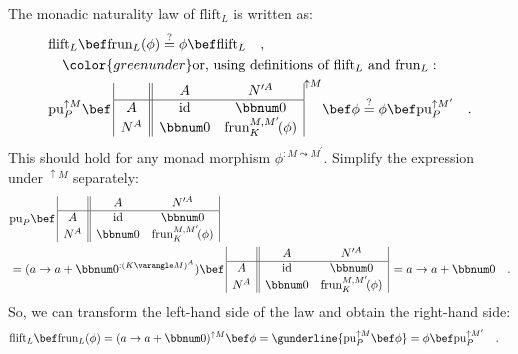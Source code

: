 The monadic naturality law of $\text{flift}_{L}$ is written as:
\begin{align*}
 & \text{flift}_{L}\bef\text{frun}_{L}(\phi)\overset{?}{=}\phi\bef\text{flift}_{L}\quad,\\
 & \quad{\color{greenunder}\text{or, using definitions of }\text{flift}_{L}\text{ and }\text{frun}_{L}:}\quad\\
 & \text{pu}_{P}^{\uparrow M}\bef\,\begin{array}{|c||cc|}
 & A & N^{\prime A}\\
\hline A & \text{id} & \bbnum 0\\
N^{A} & \bbnum 0 & \text{frun}_{K}^{M,M^{\prime}}\!(\phi)
\end{array}^{\uparrow M}\bef\phi\overset{?}{=}\phi\bef\text{pu}_{P}^{\uparrow M^{\prime}}\quad.
\end{align*}
This should hold for any monad morphism $\phi^{:M\leadsto M^{\prime}}$.
Simplify the expression under $^{\uparrow M}$ separately:
\begin{align*}
 & \text{pu}_{P}\bef\,\begin{array}{|c||cc|}
 & A & N^{\prime A}\\
\hline A & \text{id} & \bbnum 0\\
N^{A} & \bbnum 0 & \text{frun}_{K}^{M,M^{\prime}}\!(\phi)
\end{array}\\
 & =(a\rightarrow a+\bbnum 0^{:(K\varangle M)^{A}})\bef\,\begin{array}{|c||cc|}
 & A & N^{\prime A}\\
\hline A & \text{id} & \bbnum 0\\
N^{A} & \bbnum 0 & \text{frun}_{K}^{M,M^{\prime}}\!(\phi)
\end{array}\,=a\rightarrow a+\bbnum 0\quad.
\end{align*}
So, we can transform the left-hand side of the law and obtain the
right-hand side:
\begin{align*}
 & \text{flift}_{L}\bef\text{frun}_{L}(\phi)=(a\rightarrow a+\bbnum 0)^{\uparrow M}\bef\phi=\gunderline{\text{pu}_{P}^{\uparrow M}\bef\phi}=\phi\bef\text{pu}_{P}^{\uparrow M^{\prime}}\quad.
\end{align*}

